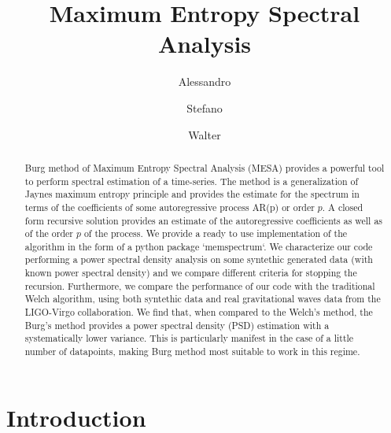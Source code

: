 \documentclass[twocolumn,showpacs,preprintnumbers,nofootinbib,prd,
superscriptaddress,10pt]{revtex4-1}
\begin{document}
\begin{abstract}
Burg method of Maximum Entropy Spectral Analysis (MESA) provides a powerful tool to perform spectral estimation of a time-series. The method is a generalization of Jaynes maximum entropy principle and provides the estimate for the spectrum in terms of the coefficients of some autoregressive process AR(p) or order $p$.
A closed form recursive solution provides an estimate of the autoregressive coefficients as well as of the order $p$ of the process.
We provide a ready to use implementation of the algorithm in the form of a python package `memspectrum`. We characterize our code performing a power spectral density analysis on some syntethic generated data (with known power spectral density) and we compare different criteria for stopping the recursion. Furthermore, we compare the performance of our code with the traditional Welch algorithm, using both syntethic data and real gravitational waves data from the LIGO-Virgo collaboration.
We find that, when compared to the Welch's method, the Burg's method provides a power spectral density (PSD) estimation with a systematically lower variance. This is particularly manifest in the case of a little number of datapoints, making Burg method most suitable to work in this regime.

\end{abstract}
	
	\title{Maximum Entropy Spectral Analysis}
	\author{Alessandro }
	\author{Stefano }
	\author{Walter }
  
	
	\maketitle
	\tableofcontents


\section{Introduction}
\end{document}
